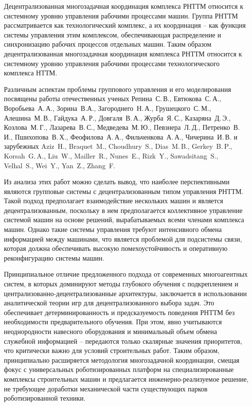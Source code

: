 Децентрализованная многозадачная координация комплекса РНТТМ относится к системному уровню управления рабочими процессами машин. Группа РНТТМ рассматривается как технологический комплекс, а их координация -- как функция системы управления этим комплексом, обеспечивающая распределение и синхронизацию рабочих процессов отдельных машин. Таким образом децентрализованная многозадачная координация комплекса РНТТМ относится к системному уровню управления рабочими процессами технологического комплекса НТТМ.

Различным аспектам проблемы группового управления и его моделирования посвящены работы отечественных ученых Репина~С.\,В., Евтюкова~С.\,А., Воробьева~А.\,А., Зорина~В.А., Загороднего~Н.\,А., Грушецкого~С.\,М., Алешина~М.\,В., Гайдука~А.\,Р., Довгаля~В.\,А., Журба~Я.\,С., Казаряна~Д.\,Э., Козлова~М.\,Г., Лазарева~В.\,С., Медведева~М.\,Ю., Певзнера~Л.\,Д., Петренко~В.\,И., Пшихопова~В.\,Х., Феофилова~А.\,А., Фильченкова~А.\,А., Чичерина~И.\,В. и зарубежных Aziz~H., Braquet~M., Choudhury~S., Dias~M.\,B., Gerkey~B.\,P., Korsah~G.\,A., Liu~W., Mailler~R., Nunes~E., Rizk~Y., Sawadsitang~S., Velhal~S., Wei~Y., Yan~Z., Zhang~F.

Из анализа этих работ можно сделать вывод, что наиболее перспективными являются групповые системы с децентрализованным типом управления РНТТМ. Такой подход предполагает взаимодействие нескольких машин и является децентрализованным, поскольку в нем предполагается коллективное управление системой машин на основе решений, вырабатываемых всеми членами комплекса машин. Однако такие системы управления требуют интенсивного обмена информацией между машинами, что является проблемой для подсистемы связи, которая должна обеспечивать высокую помехоустойчивость и оперативную реконфигурацию системы машин.

Принципиальное отличие предложенного подхода от современных многоагентных систем, в которых доминируют методы глубокого обучения с подкреплением и централизованно-децентрализованные архитектуры, заключается в использовании аналитической теории игр для децентрализованного выбора задач. Это обеспечивает детерминированность и предсказуемость поведения РНТТМ без необходимости предварительного обучения. При этом, явно учитываются неоднородности навесного оборудования и минимальный объем обмена служебной информацией -- передаются только скалярные значения приоритетов, что критически важно для условий строительных работ. Таким образом, принципиально расширяется методология многозадачной координации, смещая фокус с универсальных роботизированных платформ на специализированные комплексы строительных машин и предлагается инженерно-реализуемое решение, не требующее доработки механической части существующих парков роботизированной техники.

